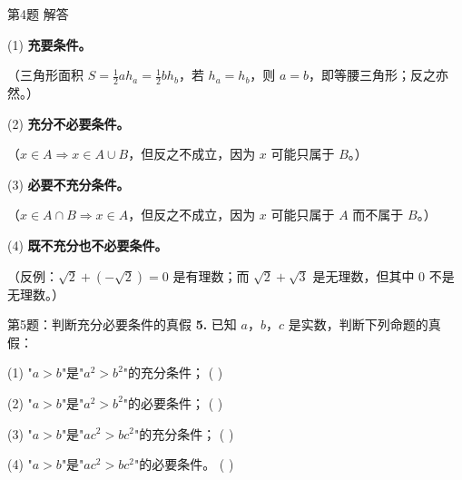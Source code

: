\documentclass[10pt,aspectratio=169,serif]{beamer}
\begin{document}
\begin{frame}[t]{第4题 解答}
\begin{tcolorbox}[colback=orange!10,colframe=orange,title=\textbf{解}]
(1) \textbf{充要条件。}

\vspace{0.3em}
\small（三角形面积 $S = \frac{1}{2} a h_a = \frac{1}{2} b h_b$，若 $h_a = h_b$，则 $a = b$，即等腰三角形；反之亦然。）

\vspace{0.6em}
(2) \textbf{充分不必要条件。}

\vspace{0.3em}
\small（$x \in A \Rightarrow x \in A \cup B$，但反之不成立，因为 $x$ 可能只属于 $B$。）

\vspace{0.6em}
(3) \textbf{必要不充分条件。}

\vspace{0.3em}
\small（$x \in A \cap B \Rightarrow x \in A$，但反之不成立，因为 $x$ 可能只属于 $A$ 而不属于 $B$。）

\vspace{0.6em}
(4) \textbf{既不充分也不必要条件。}

\vspace{0.3em}
\small（反例：$\sqrt{2} + (-\sqrt{2}) = 0$ 是有理数；而 $\sqrt{2} + \sqrt{3}$ 是无理数，但其中 $0$ 不是无理数。）
\end{tcolorbox}
\end{frame}

\begin{frame}[t]{第5题：判断充分必要条件的真假}
\textbf{5.} 已知 $a$，$b$，$c$ 是实数，判断下列命题的真假：

\vspace{0.5em}
(1) "$a > b$"是"$a^2 > b^2$"的充分条件； \hfill ( \qquad )

\vspace{0.3em}
(2) "$a > b$"是"$a^2 > b^2$"的必要条件； \hfill ( \qquad )

\vspace{0.3em}
(3) "$a > b$"是"$ac^2 > bc^2$"的充分条件； \hfill ( \qquad )

\vspace{0.3em}
(4) "$a > b$"是"$ac^2 > bc^2$"的必要条件。 \hfill ( \qquad )
\end{frame}
\end{document}
